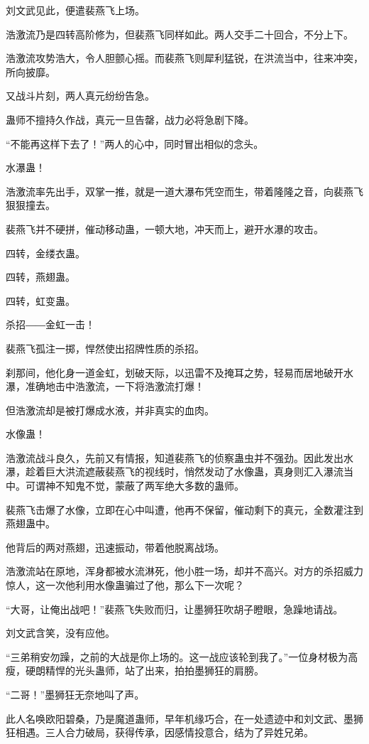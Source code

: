 \begin{this_body}
刘文武见此，便遣裴燕飞上场。

浩激流乃是四转高阶修为，但裴燕飞同样如此。两人交手二十回合，不分上下。

浩激流攻势浩大，令人胆颤心摇。而裴燕飞则犀利猛锐，在洪流当中，往来冲突，所向披靡。

又战斗片刻，两人真元纷纷告急。

蛊师不擅持久作战，真元一旦告罄，战力必将急剧下降。

“不能再这样下去了！”两人的心中，同时冒出相似的念头。

水瀑蛊！

浩激流率先出手，双掌一推，就是一道大瀑布凭空而生，带着隆隆之音，向裴燕飞狠狠撞去。

裴燕飞并不硬拼，催动移动蛊，一顿大地，冲天而上，避开水瀑的攻击。

四转，金缕衣蛊。

四转，燕翅蛊。

四转，虹变蛊。

杀招――金虹一击！

裴燕飞孤注一掷，悍然使出招牌性质的杀招。

刹那间，他化身一道金虹，划破天际，以迅雷不及掩耳之势，轻易而居地破开水瀑，准确地击中浩激流，一下将浩激流打爆！

但浩激流却是被打爆成水液，并非真实的血肉。

水像蛊！

浩激流战斗良久，先前又有情报，知道裴燕飞的侦察蛊虫并不强劲。因此发出水瀑，趁着巨大洪流遮蔽裴燕飞的视线时，悄然发动了水像蛊，真身则汇入瀑流当中。可谓神不知鬼不觉，蒙蔽了两军绝大多数的蛊师。

裴燕飞击爆了水像，立即在心中叫遭，他再不保留，催动剩下的真元，全数灌注到燕翅蛊中。

他背后的两对燕翅，迅速振动，带着他脱离战场。

浩激流站在原地，浑身都被水流淋死，他小胜一场，却并不高兴。对方的杀招威力惊人，这一次他利用水像蛊骗过了他，那么下一次呢？

“大哥，让俺出战吧！”裴燕飞失败而归，让墨狮狂吹胡子瞪眼，急躁地请战。

刘文武含笑，没有应他。

“三弟稍安勿躁，之前的大战是你上场的。这一战应该轮到我了。”一位身材极为高瘦，硬朗精悍的光头蛊师，站了出来，拍拍墨狮狂的肩膀。

“二哥！”墨狮狂无奈地叫了声。

此人名唤欧阳碧桑，乃是魔道蛊师，早年机缘巧合，在一处遗迹中和刘文武、墨狮狂相遇。三人合力破局，获得传承，因感情投意合，结为了异姓兄弟。


\end{this_body}
